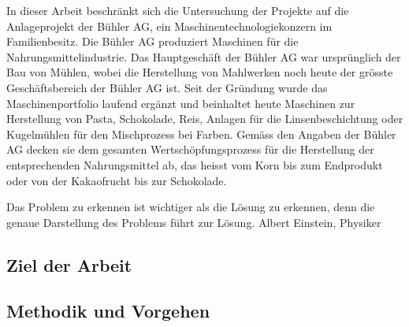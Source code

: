 \newline In dieser Arbeit beschränkt sich die Untersuchung der Projekte auf die Anlageprojekt der Bühler AG, ein Maschinentechnologiekonzern im Familienbesitz. Die Bühler AG produziert Maschinen für die Nahrungsmittelindustrie. Das Hauptgeschäft der Bühler AG war ursprünglich der Bau von Mühlen, wobei die Herstellung von Mahlwerken noch heute der grösste Geschäftsbereich der Bühler AG ist. Seit der Gründung wurde das Maschinenportfolio laufend ergänzt und beinhaltet heute Maschinen zur Herstellung von Pasta, Schokolade, Reis, Anlagen für die Linsenbeschichtung oder Kugelmühlen für den Mischprozess bei Farben. Gemäss den Angaben der Bühler AG decken sie dem gesamten Wertschöpfungsprozess für die Herstellung der entsprechenden Nahrungsmittel ab, das heisst vom Korn bis zum Endprodukt oder von der Kakaofrucht bis zur Schokolade.
\newline




Das Problem zu erkennen ist wichtiger als die Lösung zu erkennen, denn die genaue Darstellung des Problems führt zur Lösung. 
Albert Einstein, Physiker
	\subsection{Ziel der Arbeit}
	\subsection{Methodik und Vorgehen}
	

	




